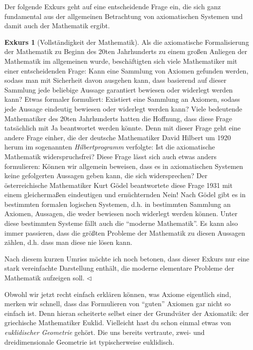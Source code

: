 \documentclass[11pt,reqno, a4paper]{book}
\theoremstyle{mystyle}
\theoremstyle{definition}
\newtheorem{exkursth}[theorem]{Exkurs}
\newenvironment{exkurs}{\begin{exkursth}}{\hspace{\fill}$\triangleleft$\end{exkursth}}
\numberwithin{equation}{chapter}
\begin{document}
Der folgende Exkurs geht auf eine entscheidende Frage ein, die sich ganz fundamental aus der allgemeinen Betrachtung von axiomatischen Systemen und damit auch der Mathematik ergibt. 

\begin{exkurs}[Vollständigkeit der Mathematik]
    Als die axiomatische Formalisierung der Mathematik zu Beginn des 20ten Jahrhunderts zu einem großen Anliegen der Mathematik im allgemeinen wurde, beschäftigten sich viele Mathematiker mit einer entscheidenden Frage: Kann eine Sammlung von Axiomen gefunden werden, sodass man mit Sicherheit davon ausgehen kann, dass basierend auf dieser Sammlung jede beliebige Aussage garantiert bewiesen oder widerlegt werden kann? Etwas formaler formuliert: Existiert eine Sammlung an Axiomen, sodass jede Aussage eindeutig bewiesen oder widerlegt werden kann? Viele bedeutende Mathematiker des 20ten Jahrhunderts hatten die Hoffnung, dass diese Frage tatsächlich mit Ja beantwortet werden könnte. Denn mit dieser Frage geht eine andere Frage einher, die der deutsche Mathematiker David Hilbert um 1920 herum im sogenannten \textit{Hilbertprogramm} verfolgte: Ist die axiomatische Mathematik widerspruchsfrei? Diese Frage lässt sich auch etwas anders formulieren: Können wir allgemein beweisen, dass es in axiomatischen Systemen keine gefolgerten Aussagen geben kann, die sich widersprechen? Der österreichische Mathematiker Kurt Gödel beantwortete diese Frage 1931 mit einem gleichermaßen eindeutigen und ernüchternden Nein! Nach Gödel gibt es in bestimmten formalen logischen Systemen, d.h. in bestimmten Sammlung an Axiomen, Aussagen, die weder bewiesen noch widerlegt werden können. Unter diese bestimmten Systeme fällt auch die "`moderne Mathematik"'. Es kann also immer passieren, dass die größten Probleme der Mathematik zu diesen Aussagen zählen, d.h. dass man diese nie lösen kann. 

    Nach diesem kurzen Umriss möchte ich noch betonen, dass dieser Exkurs nur eine stark vereinfachte Darstellung enthält, die moderne elementare Probleme der Mathematik aufzeigen soll. 
\end{exkurs}

Obwohl wir jetzt recht einfach erklären können, was Axiome eigentlich sind, merken wir schnell, dass das Formulieren von "`guten"' Axiomen gar nicht so einfach ist. Denn hieran scheiterte selbst einer der Grundväter der Axiomatik: der griechische Mathematiker Euklid. Vielleicht hast du schon einmal etwas von \textit{euklidischer Geometrie} gehört. Die uns bereits vertraute, zwei- und dreidimensionale Geometrie ist typischerweise euklidisch. 
\end{document}
